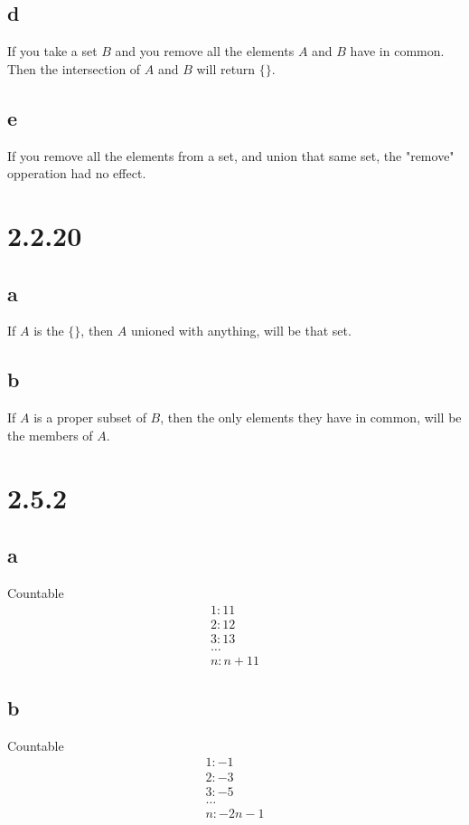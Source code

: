 \documentclass{article}
\begin{document}
{			\subsection* {d}
				If you take a set $B$ and you remove all the elements $A$ and $B$ have in common. Then the intersection of $A$ and $B$ will return $\{\}$.
			\subsection* {e}
				If you remove all the elements from a set, and union that same set, the "remove" opperation had no effect.

		\section* {\Large{\textbf{2.2.20}}}
			\subsection* {a}
				If $A$ is the $\{\}$, then $A$ unioned with anything, will be that set.
			\subsection* {b}
				If $A$ is a proper subset of $B$, then the only elements they have in common, will be the members of $A$.
		\section* {\Large{\textbf{2.5.2}}}
			\subsection* {a}
				Countable
				\[
				\begin{matrix}
					1: 11 \\
					2: 12 \\
					3: 13 \\
					\dots \\
					n: n+11 
				\end{matrix}
				\]
				
			\subsection* {b}
				Countable
				\[
					\begin{matrix}
						1: -1   \\
						2: -3   \\
						3: -5   \\
						\dots   \\
						n: -2n-1\\
					\end{matrix}
				\]
}
\end{document}

